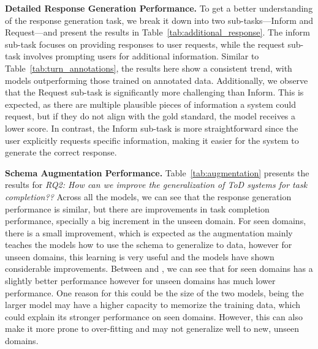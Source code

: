 




\noindent
\textbf{Detailed Response Generation Performance.}
To get a better understanding of the response generation task, we break it down into two sub-tasks---Inform and Request---and present the results in Table~\ref{tab:additional_response}. The inform sub-task focuses on providing responses to user requests, while the request sub-task involves prompting users for additional information. 
Similar to Table~\ref{tab:turn_annotations}, the results here show a consistent trend, with {\oursys} models outperforming those trained on annotated data.
Additionally, we observe that the Request sub-task is significantly more challenging than Inform. This is expected, as there are multiple plausible pieces of information a system could request, but if they do not align with the gold standard, the model receives a lower score. In contrast, the Inform sub-task is more straightforward since the user explicitly requests specific information, making it easier for the system to generate the correct response.

\noindent
\textbf{Schema Augmentation Performance.}
Table~\ref{tab:augmentation} presents the results for \textit{RQ2: How can we improve the {\ood} generalization of ToD systems for task completion??} 
Across all the models, we can see that the response generation performance is similar, but there are improvements in task completion performance, specially a big increment in the unseen domain. For seen domains, there is a small improvement, which is expected as the augmentation mainly teaches the models how to use the schema to generalize to {\ood} data, however for unseen domains, this learning is very useful and the models have shown considerable improvements.
Between {\llamai} and {\flan}, we can see that for seen domains {\llamai} has a slightly better performance however for unseen domains {\llamai} has much lower performance. One reason for this could be the size of the two models, {\llamai} being the larger model may have a higher capacity to memorize the training data, which could explain its stronger performance on seen domains. However, this can also make it more prone to over-fitting and may not generalize well to new, unseen domains.



